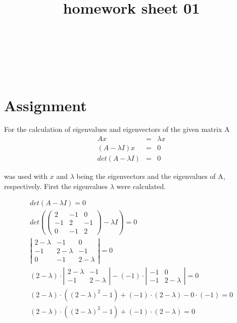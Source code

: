 \documentclass{article}
\title{homework sheet 01}
\author{
\name{Andre Seitz}\\
\imat{3622870}\\
\email{andre.seitz@mytum.de}
\And
\name{Linda Leidig} \\
\imat{3608416}\\
\email{linda.leidig@tum.de}
}
\begin{document}
\maketitle

\section{Assignment}		%
For the calculation of eigenvalues and eigenvectors of the given matrix A
\begin{eqnarray}
A x &=& \lambda x \label{definition}
\\
(A-\lambda I)x &=& 0\\
det(A-\lambda I) &=& 0
\end{eqnarray}

was used with $x$ and $\lambda$ being the eigenvectors and the eigenvalues of A, respectively. First the eigenvalues $\lambda$ were calculated.

\begin{eqnarray}
det ( A - \lambda I ) = 0 \\
det ( \left(
\begin{array}{ccc}
2 & -1 & 0 \\
-1 & 2 & -1 \\
0 & -1 & 2
\end{array}
\right) - \lambda I ) = 0 \\
\left|
\begin{array}{ccc}
2-\lambda & -1 & 0 \\
-1 & 2-\lambda & -1 \\
0 & -1 & 2-\lambda 
\end{array}
\right| = 0 \\
(2-\lambda) \cdot \left|
\begin{array}{cc}
2-\lambda & -1 \\
-1 & 2-\lambda 
\end{array} \right|
- (-1) \cdot \left|
\begin{array}{cc}
-1 & 0 \\
-1 & 2-\lambda
\end{array} \right| = 0 \\
(2-\lambda)\cdot((2-\lambda)^2-1)+(-1)\cdot(2-\lambda)-0\cdot(-1) = 0\\
(2-\lambda)\cdot((2-\lambda)^2-1)+(-1)\cdot(2-\lambda) = 0
\end{eqnarray}
\end{document}
